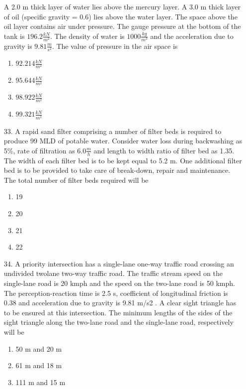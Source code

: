 \documentclass[journal]{IEEEtran}
\begin{document}
\begin{enumerate}
    A 2.0 m thick layer of water lies above the mercury layer. A 3.0 m thick layer of oil
    (specific gravity = 0.6) lies above the water layer. The space above the oil layer contains
    air under pressure. The gauge pressure at the bottom of the tank is $196.2 \frac{kN}{m^2}$. The density of water is $1000 \frac{kg}{m^3}$
    and the acceleration due to gravity is $9.81 \frac{m}{s^2}$. The value
    of pressure in the air space is 
    \begin{enumerate}[label=(\Alph*)]
        \item $92.214 \frac{kN}{m^2}$
        \item $95.644 \frac{kN}{m^2}$
        \item $98.922 \frac{kN}{m^2}$
        \item $99.321 \frac{kN}{m^2}$
    \end{enumerate} 
    \item[33.] A rapid sand filter comprising a number of filter beds is required to produce 99 MLD of
    potable water. Consider water loss during backwashing as 5\%, rate of filtration as $6.0 \frac{m}{h}$
    and length to width ratio of filter bed as 1.35. The width of each filter bed is to be kept
    equal to 5.2 m. One additional filter bed is to be provided to take care of break-down,
    repair and maintenance. The total number of filter beds required will be
    \begin{enumerate}[label=(\Alph*)]
        \item 19
        \item 20
        \item 21
        \item 22
    \end{enumerate}
    \item[34.] A priority intersection has a single-lane one-way traffic road crossing an undivided twolane two-way traffic road. The traffic stream speed on the single-lane road is 20 kmph and
    the speed on the two-lane road is 50 kmph. The perception-reaction time is 2.5 s, coefficient of longitudinal friction is 0.38 and acceleration due to gravity is 9.81 m/s2
    . A clear sight triangle has to be ensured at this intersection. The minimum lengths of the sides
    of the sight triangle along the two-lane road and the single-lane road, respectively will be
    \begin{enumerate}[label=(\Alph*)]
        \item 50 m and 20 m 
        \item 61 m and 18 m 
        \item 111 m and 15 m 

\end{enumerate}
\end{enumerate}
\end{document}
